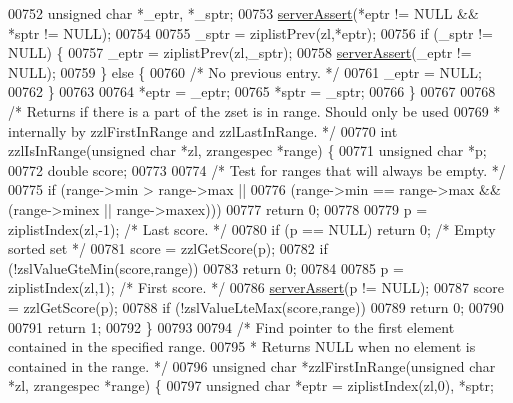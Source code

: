 \begin{DoxyCode}
00752     \textcolor{keywordtype}{unsigned} \textcolor{keywordtype}{char} *\_eptr, *\_sptr;
00753     \hyperlink{server_8h_a88114b5169b4c382df6b56506285e56a}{serverAssert}(*eptr != NULL && *sptr != NULL);
00754 
00755     \_sptr = ziplistPrev(zl,*eptr);
00756     \textcolor{keywordflow}{if} (\_sptr != NULL) \{
00757         \_eptr = ziplistPrev(zl,\_sptr);
00758         \hyperlink{server_8h_a88114b5169b4c382df6b56506285e56a}{serverAssert}(\_eptr != NULL);
00759     \} \textcolor{keywordflow}{else} \{
00760         \textcolor{comment}{/* No previous entry. */}
00761         \_eptr = NULL;
00762     \}
00763 
00764     *eptr = \_eptr;
00765     *sptr = \_sptr;
00766 \}
00767 
00768 \textcolor{comment}{/* Returns if there is a part of the zset is in range. Should only be used}
00769 \textcolor{comment}{ * internally by zzlFirstInRange and zzlLastInRange. */}
00770 \textcolor{keywordtype}{int} zzlIsInRange(\textcolor{keywordtype}{unsigned} \textcolor{keywordtype}{char} *zl, zrangespec *range) \{
00771     \textcolor{keywordtype}{unsigned} \textcolor{keywordtype}{char} *p;
00772     \textcolor{keywordtype}{double} score;
00773 
00774     \textcolor{comment}{/* Test for ranges that will always be empty. */}
00775     \textcolor{keywordflow}{if} (range->min > range->max ||
00776             (range->min == range->max && (range->minex || range->maxex)))
00777         \textcolor{keywordflow}{return} 0;
00778 
00779     p = ziplistIndex(zl,-1); \textcolor{comment}{/* Last score. */}
00780     \textcolor{keywordflow}{if} (p == NULL) \textcolor{keywordflow}{return} 0; \textcolor{comment}{/* Empty sorted set */}
00781     score = zzlGetScore(p);
00782     \textcolor{keywordflow}{if} (!zslValueGteMin(score,range))
00783         \textcolor{keywordflow}{return} 0;
00784 
00785     p = ziplistIndex(zl,1); \textcolor{comment}{/* First score. */}
00786     \hyperlink{server_8h_a88114b5169b4c382df6b56506285e56a}{serverAssert}(p != NULL);
00787     score = zzlGetScore(p);
00788     \textcolor{keywordflow}{if} (!zslValueLteMax(score,range))
00789         \textcolor{keywordflow}{return} 0;
00790 
00791     \textcolor{keywordflow}{return} 1;
00792 \}
00793 
00794 \textcolor{comment}{/* Find pointer to the first element contained in the specified range.}
00795 \textcolor{comment}{ * Returns NULL when no element is contained in the range. */}
00796 \textcolor{keywordtype}{unsigned} \textcolor{keywordtype}{char} *zzlFirstInRange(\textcolor{keywordtype}{unsigned} \textcolor{keywordtype}{char} *zl, zrangespec *range) \{
00797     \textcolor{keywordtype}{unsigned} \textcolor{keywordtype}{char} *eptr = ziplistIndex(zl,0), *sptr;

\end{DoxyCode}
